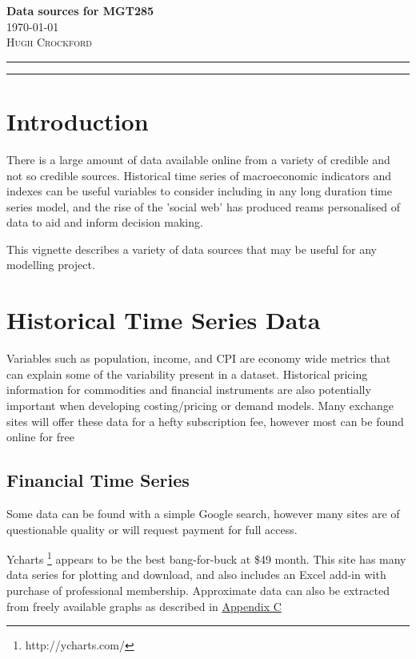 \documentclass[11pt]{article}
\begin{document}
\begin{flushleft}
	\vspace*{0.3in}
	\Huge \textbf{Data sources for MGT285}\\
	\Large \today \\
	\vspace{0.25in}
	\textsc{Hugh Crockford}
	\vspace{0.25in}
	\hrule
	\hrule
	\tableofcontents
\end{flushleft}

	\vspace{0.75in}

\newpage
\section{Introduction}
	There is a large amount of data available online from a variety of credible and not so credible sources.
	Historical time series of macroeconomic indicators and indexes can be useful variables to consider including in any long duration time series model, and the rise of the 'social web' has produced reams personalised of data to aid and inform decision making.


	This vignette describes a variety of data sources that may be useful for any modelling project.

\section{Historical Time Series Data}
	Variables such as population, income, and CPI are economy wide metrics that can explain some of the variability present in a dataset.
	Historical pricing information for commodities and financial instruments are also potentially important when developing costing/pricing or demand models.
	Many exchange sites will offer these data for a hefty subscription fee, however most can be found online for free

	\subsection{Financial Time Series}
	Some data can be found with a simple Google search, however many sites are of questionable quality or will request payment for full access.


	Ycharts \footnote{http://ycharts.com/} appears to be the best bang-for-buck at \$49 month. 
	This site has many data series for plotting and download, and also includes an Excel add-in with purchase of professional membership.
	Approximate data can also be extracted from freely available graphs as described in \hyperref[graph]{Appendix C}
\end{document}
